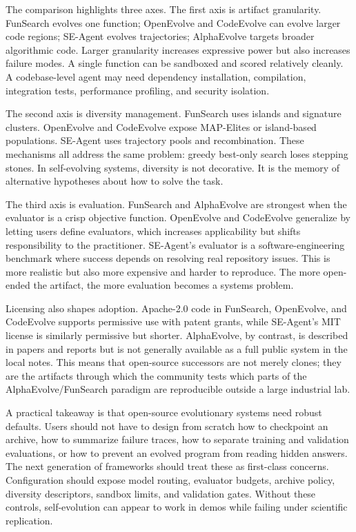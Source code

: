 The comparison highlights three axes.  The first axis is artifact granularity.  FunSearch evolves one function; OpenEvolve and CodeEvolve can evolve larger code regions; SE-Agent evolves trajectories; AlphaEvolve targets broader algorithmic code.  Larger granularity increases expressive power but also increases failure modes.  A single function can be sandboxed and scored relatively cleanly.  A codebase-level agent may need dependency installation, compilation, integration tests, performance profiling, and security isolation.

The second axis is diversity management.  FunSearch uses islands and signature clusters.  OpenEvolve and CodeEvolve expose MAP-Elites or island-based populations.  SE-Agent uses trajectory pools and recombination.  These mechanisms all address the same problem: greedy best-only search loses stepping stones.  In self-evolving systems, diversity is not decorative.  It is the memory of alternative hypotheses about how to solve the task.

The third axis is evaluation.  FunSearch and AlphaEvolve are strongest when the evaluator is a crisp objective function.  OpenEvolve and CodeEvolve generalize by letting users define evaluators, which increases applicability but shifts responsibility to the practitioner.  SE-Agent's evaluator is a software-engineering benchmark where success depends on resolving real repository issues.  This is more realistic but also more expensive and harder to reproduce.  The more open-ended the artifact, the more evaluation becomes a systems problem.

Licensing also shapes adoption.  Apache-2.0 code in FunSearch, OpenEvolve, and CodeEvolve supports permissive use with patent grants, while SE-Agent's MIT license is similarly permissive but shorter.  AlphaEvolve, by contrast, is described in papers and reports but is not generally available as a full public system in the local notes.  This means that open-source successors are not merely clones; they are the artifacts through which the community tests which parts of the AlphaEvolve/FunSearch paradigm are reproducible outside a large industrial lab.

A practical takeaway is that open-source evolutionary systems need robust defaults.  Users should not have to design from scratch how to checkpoint an archive, how to summarize failure traces, how to separate training and validation evaluations, or how to prevent an evolved program from reading hidden answers.  The next generation of frameworks should treat these as first-class concerns.  Configuration should expose model routing, evaluator budgets, archive policy, diversity descriptors, sandbox limits, and validation gates.  Without these controls, self-evolution can appear to work in demos while failing under scientific replication.

